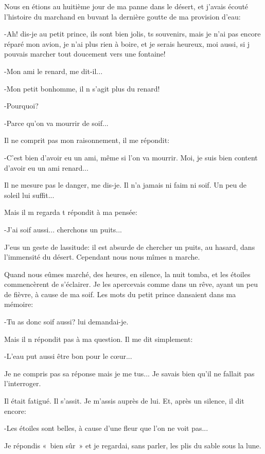\documentclass{report}
\begin{document}

\parachapter{} %
Nous en étions au huitième jour de ma panne dans le désert, et j'avais écouté l'histoire du marchand en buvant la dernière goutte de ma provision d'eau:

-Ah! dis-je au petit prince, ils sont bien jolis, ts souvenirs, mais je n'ai pas encore réparé mon avion, je n'ai plus rien à boire, et je serais heureux, moi aussi, si j pouvais marcher tout doucement vers une fontaine!

-Mon ami le renard, me dit-il...

-Mon petit bonhomme, il n s'agit plus du renard!

-Pourquoi?

-Parce qu'on va mourrir de soif...

Il ne comprit pas mon raisonnement, il me répondit:

-C'est bien d'avoir eu un ami, même si l'on va mourrir. Moi, je suis bien content d'avoir eu un ami renard...

Il ne mesure pas le danger, me dis-je. Il n'a jamais ni faim ni soif. Un peu de soleil lui suffit...

Mais il m regarda t répondit à ma pensée:

-J'ai soif aussi... cherchons un puits...

J'eus un geste de lassitude: il est absurde de chercher un puits, au hasard, dans l'immensité du désert. Cependant nous nous mîmes n marche.

Quand nous eûmes marché, des heures, en silence, la nuit tomba, et les étoiles commencèrent de s'éclairer. Je les apercevais comme dans un rêve, ayant un peu de fièvre, à cause de ma soif. Les mots du petit prince dansaient dans ma mémoire:

-Tu as donc soif aussi? lui demandai-je.

Mais il n répondit pas à ma question. Il me dit simplement:

-L'eau put aussi être bon pour le cœur...

Je ne compris pas sa réponse mais je me tus... Je savais bien qu'il ne fallait pas l'interroger.

Il était fatigué. Il s'assit. Je m'assis auprès de lui. Et, après un silence, il dit encore:

-Les étoiles sont belles, à cause d'une fleur que l'on ne voit pas...

Je répondis «~bien sûr~» et je regardai, sans parler, les plis du sable sous la lune.
\end{document}
